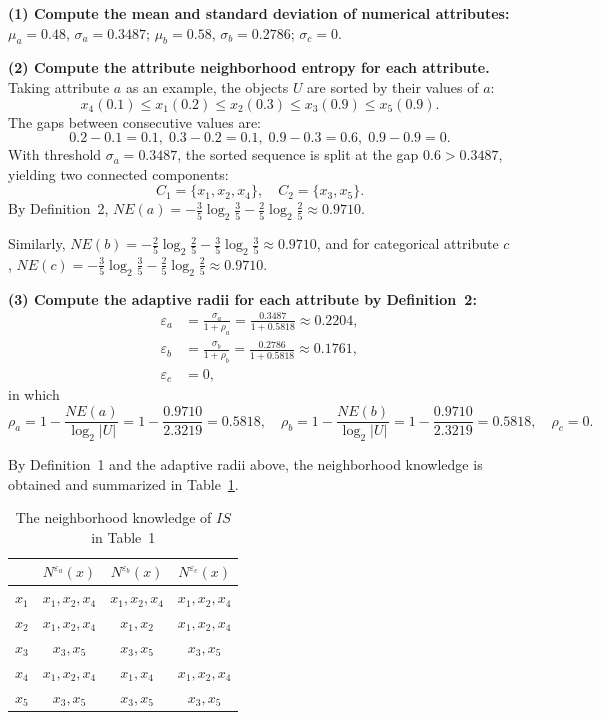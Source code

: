\documentclass[lettersize,journal]{IEEEtran}
\begin{document}
\textbf{(1) Compute the mean and standard deviation of numerical attributes:}
\(\mu_{a} = 0.48\), \(\sigma_{a} = 0.3487\); \(\mu_{b} = 0.58\), \(\sigma_{b} = 0.2786\);
\(\sigma_{c} = 0\).

\textbf{(2) Compute the attribute neighborhood entropy for each attribute.} Taking attribute \(a\) as
an example, the objects \(U\) are sorted by their values of \(a\):
\[
x_{4}(0.1) \leq x_{1}(0.2) \leq x_{2}(0.3) \leq x_{3}(0.9) \leq x_{5}(0.9).
\]
The gaps between consecutive values are:
\[
0.2-0.1 = 0.1,\; 0.3-0.2 = 0.1,\; 0.9-0.3 = 0.6,\; 0.9-0.9 = 0.
\]
With threshold \(\sigma_{a} = 0.3487\), the sorted sequence is split at the gap \(0.6 > 0.3487\),
yielding two connected components:
\[
C_{1} = \{x_{1}, x_{2}, x_{4}\},\quad C_{2} = \{x_{3}, x_{5}\}.
\]
By Definition~2,
\(NE(a) = -\frac{3}{5}\log_{2}\frac{3}{5} - \frac{2}{5}\log_{2}\frac{2}{5} \approx 0.9710\).

Similarly,
\(NE(b) = -\frac{2}{5}\log_{2}\frac{2}{5} - \frac{3}{5}\log_{2}\frac{3}{5} \approx 0.9710\),
and for categorical attribute \(c\),
\(NE(c) = -\frac{3}{5}\log_{2}\frac{3}{5} - \frac{2}{5}\log_{2}\frac{2}{5} \approx 0.9710\).

\textbf{(3) Compute the adaptive radii for each attribute by Definition~2:}
\begin{align*}
\varepsilon_{a} &= \frac{\sigma_{a}}{1 + \rho_{a}} = \frac{0.3487}{1 + 0.5818} \approx 0.2204, \\
\varepsilon_{b} &= \frac{\sigma_{b}}{1 + \rho_{b}} = \frac{0.2786}{1 + 0.5818} \approx 0.1761, \\
\varepsilon_{c} &= 0,
\end{align*}
in which
\[
\rho_{a} = 1 - \frac{NE(a)}{\log_{2}|U|} = 1 - \frac{0.9710}{2.3219} = 0.5818,\quad
\rho_{b} = 1 - \frac{NE(b)}{\log_{2}|U|} = 1 - \frac{0.9710}{2.3219} = 0.5818,\quad
\rho_{c} = 0.
\]

By Definition~1 and the adaptive radii above, the neighborhood knowledge is obtained and summarized in
Table~\ref{tab:neighborhood}.

\begin{table}[!t]
\caption{The neighborhood knowledge of \(IS\) in Table~1}
\label{tab:neighborhood}
\centering
\begin{tabular}{cccc}
\toprule
& \(N^{\varepsilon_{a}}(x)\) & \(N^{\varepsilon_{b}}(x)\) & \(N^{\varepsilon_{c}}(x)\) \\
\midrule
\(x_{1}\) & \(x_{1},x_{2},x_{4}\) & \(x_{1},x_{2},x_{4}\) & \(x_{1},x_{2},x_{4}\) \\
\(x_{2}\) & \(x_{1},x_{2},x_{4}\) & \(x_{1},x_{2}\) & \(x_{1},x_{2},x_{4}\) \\
\(x_{3}\) & \(x_{3},x_{5}\) & \(x_{3},x_{5}\) & \(x_{3},x_{5}\) \\
\(x_{4}\) & \(x_{1},x_{2},x_{4}\) & \(x_{1},x_{4}\) & \(x_{1},x_{2},x_{4}\) \\
\(x_{5}\) & \(x_{3},x_{5}\) & \(x_{3},x_{5}\) & \(x_{3},x_{5}\) \\
\bottomrule
\end{tabular}
\end{table}
\end{document}
